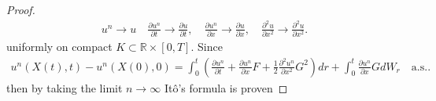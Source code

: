 \begin{proof}
  \begin{align*}
    u^{n} \to  u \quad \frac{\partial u^{n } }{\partial t} \to \frac{\partial u}{\partial t} , \quad \frac{\partial u^{n } }{\partial x} \to \frac{\partial u}{\partial x} , \quad \frac{\partial ^2 u}{\partial x^2} \to \frac{\partial ^2 u}{\partial x^2} 
  .\end{align*}
  uniformly on compact $K \subset  \mathbb{R}\times [0,T]$. Since 
  \begin{align*}
    u^{n}(X(t),t) -u^{n}(X(0),0)  = \int_0^{t} \left( \frac{\partial u^{n } }{\partial t} +\frac{\partial u^{n } }{\partial x} F + \frac{1}{2} \frac{\partial ^2 u^{n} }{\partial x^2} G^2  \right)  dr + \int_0^{t} \frac{\partial u^{n } }{\partial x}  GdW_r \quad \text{a.s.} 
  .\end{align*}
  then by taking the limit $n\to \infty$ It\^o's formula is proven 
\end{proof}



